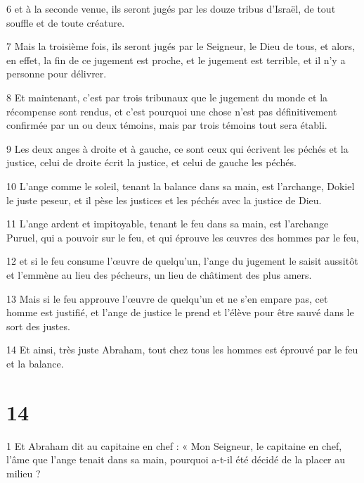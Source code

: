 \par 6 et à la seconde venue, ils seront jugés par les douze tribus d'Israël, de tout souffle et de toute créature.

\par 7 Mais la troisième fois, ils seront jugés par le Seigneur, le Dieu de tous, et alors, en effet, la fin de ce jugement est proche, et le jugement est terrible, et il n'y a personne pour délivrer.

\par 8 Et maintenant, c'est par trois tribunaux que le jugement du monde et la récompense sont rendus, et c'est pourquoi une chose n'est pas définitivement confirmée par un ou deux témoins, mais par trois témoins tout sera établi.

\par 9 Les deux anges à droite et à gauche, ce sont ceux qui écrivent les péchés et la justice, celui de droite écrit la justice, et celui de gauche les péchés.

\par 10 L'ange comme le soleil, tenant la balance dans sa main, est l'archange, Dokiel le juste peseur, et il pèse les justices et les péchés avec la justice de Dieu.

\par 11 L'ange ardent et impitoyable, tenant le feu dans sa main, est l'archange Puruel, qui a pouvoir sur le feu, et qui éprouve les œuvres des hommes par le feu,

\par 12 et si le feu consume l'œuvre de quelqu'un, l'ange du jugement le saisit aussitôt et l'emmène au lieu des pécheurs, un lieu de châtiment des plus amers.

\par 13 Mais si le feu approuve l'œuvre de quelqu'un et ne s'en empare pas, cet homme est justifié, et l'ange de justice le prend et l'élève pour être sauvé dans le sort des justes.

\par 14 Et ainsi, très juste Abraham, tout chez tous les hommes est éprouvé par le feu et la balance.

\chapter{14}

\par 1 Et Abraham dit au capitaine en chef : « Mon Seigneur, le capitaine en chef, l'âme que l'ange tenait dans sa main, pourquoi a-t-il été décidé de la placer au milieu ?

